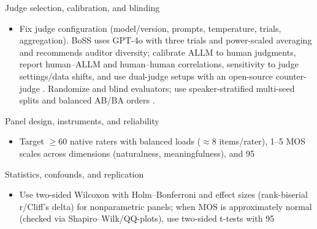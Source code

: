 \documentclass{article}
\begin{document}
Judge selection, calibration, and blinding
\begin{itemize}
  \item Fix judge configuration (model/version, prompts, temperature, trials, aggregation). BoSS uses GPT-4o with three trials and power-scaled averaging and recommends auditor diversity; calibrate ALLM to human judgments, report human--ALLM and human--human correlations, sensitivity to judge settings/data shifts, and use dual-judge setups with an open-source counter-judge \cite{wang2025bossbeyondsemanticspeech}. Randomize and blind evaluators; use speaker-stratified multi-seed splits and balanced AB/BA orders \cite{vashishth2024stabspeechtokenizerassessmentbenchmark,chen2023reducingbarriersselfsupervisedlearninghu}.
\end{itemize}

Panel design, instruments, and reliability
\begin{itemize}
  \item Target $\geq$60 native raters with balanced loads ($\approx$8 items/rater), 1--5 MOS scales across dimensions (naturalness, meaningfulness), and 95%
\end{itemize}

Statistics, confounds, and replication
\begin{itemize}
  \item Use two-sided Wilcoxon with Holm--Bonferroni and effect sizes (rank-biserial r/Cliff's delta) for nonparametric panels; when MOS is approximately normal (checked via Shapiro--Wilk/QQ-plots), use two-sided t-tests with 95%
\end{itemize}
\end{document}
